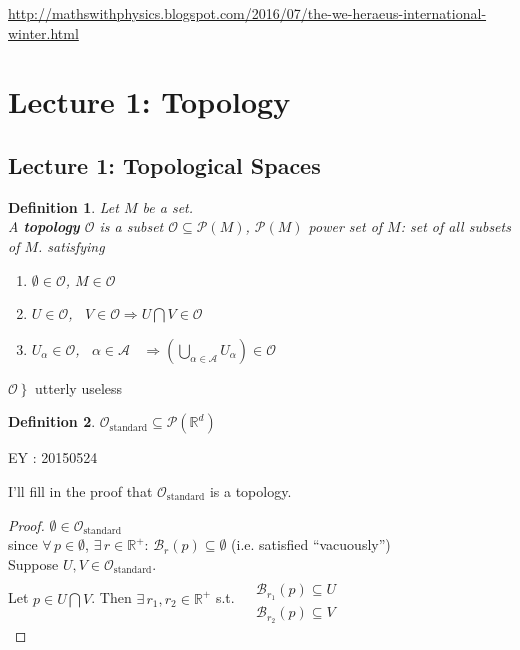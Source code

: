 \documentclass[10pt]{amsart}
\newtheorem{definition}{Definition}
\begin{document}
\begin{multicols*}{2}
\url{http://mathswithphysics.blogspot.com/2016/07/the-we-heraeus-international-winter.html}

\section{Lecture 1: Topology}

\subsection{Lecture 1: Topological Spaces}

\begin{definition}
	Let $M$ be a set.  \\
	A \textbf{topology} $\mathcal{O}$ is a subset $\mathcal{O} \subseteq \mathcal{P}(M)$, $\mathcal{P}(M)$ power set of $M$: set of all subsets of $M$. satisfying
	\begin{enumerate}
		\item[(i)] $\emptyset \in \mathcal{O}$, $M \in \mathcal{O}$ 
		\item[(ii)] $ U \in \mathcal{O}$, \, $V \in \mathcal{O} \Longrightarrow U\bigcap V \in \mathcal{O}$ 
		\item[(iii)] $U_{\alpha} \in \mathcal{O}$, \, $\alpha \in \mathcal{A}$ \, $\Longrightarrow \left( \bigcup_{\alpha \in \mathcal{A}} U_{\alpha} \right) \in \mathcal{O}$
	\end{enumerate}
\end{definition}

$ \left. \mathcal{O} \right\} $ utterly useless

\begin{definition}
	$\mathcal{O}_{\text{standard}} \subseteq \mathcal{P}(\mathbb{R}^d)$
\end{definition}

EY : 20150524 

I'll fill in the proof that $\mathcal{O}_{\text{standard}}$ is a topology.  

\begin{proof}
	$\emptyset \in \mathcal{O}_{\text{standard}}$ \\
	since $\forall \, p \in \emptyset$, $\exists \, r \in \mathbb{R}^+$: $\mathcal{B}_r(p) \subseteq \emptyset$ (i.e. satisfied ``vacuously'') \\
	
	Suppose $U,V \in \mathcal{O}_{\text{standard}}$.  \\
	Let $p \in U \bigcap V$.  Then $\exists \, r_1, r_2 \in \mathbb{R}^+$ s.t. $\begin{aligned} & \quad \\
	& \mathcal{B}_{r_1}(p) \subseteq U \\
	& \mathcal{B}_{r_2}(p) \subseteq V \end{aligned}$ \\
	

\end{proof}
\end{multicols*}
\end{document}
